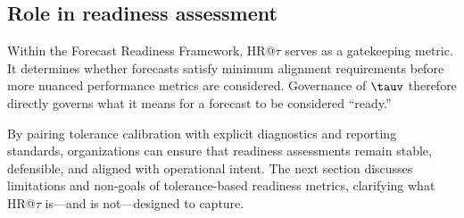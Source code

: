 \subsection{Role in readiness assessment}
\label{subsec:role_in_readiness}

Within the Forecast Readiness Framework, HR@$\tau$ serves as a gatekeeping metric.
It determines whether forecasts satisfy minimum alignment requirements before
more nuanced performance metrics are considered.
Governance of $\tauv$ therefore directly governs what it means for a forecast to
be considered ``ready.''

By pairing tolerance calibration with explicit diagnostics and reporting
standards, organizations can ensure that readiness assessments remain stable,
defensible, and aligned with operational intent.
The next section discusses limitations and non-goals of tolerance-based readiness
metrics, clarifying what HR@$\tau$ is—and is not—designed to capture.
